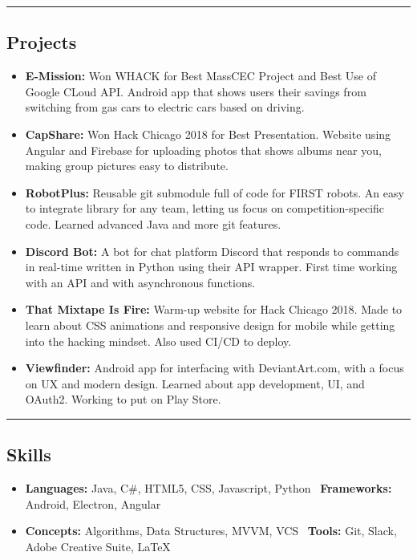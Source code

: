 \documentclass[11pt,letterpaper]{article}
\begin{document}
\hrule
\vspace{-0.4em}
\subsection*{Projects}

\begin{itemize}
	\parskip=0.1em
	
	\item \textbf{E-Mission:}
		Won WHACK for Best MassCEC Project and Best Use of Google CLoud API. Android app that shows users their savings from switching from gas cars to electric cars based on driving. 
	
	\item \textbf{CapShare:}
		Won Hack Chicago 2018 for Best Presentation. Website using Angular and Firebase for uploading photos that shows albums near you, making group pictures easy to distribute. 
		
	\item \textbf{RobotPlus:}
		Reusable git submodule full of code for FIRST robots. An easy to integrate library for any team, letting us focus on competition-specific code. Learned advanced Java and more git features. 
		
	\item \textbf{Discord Bot:}
		A bot for chat platform Discord that responds to commands in real-time written in Python using their API wrapper. First time working with an API and with asynchronous functions.
		
	\item \textbf{That Mixtape Is Fire:}
		Warm-up website for Hack Chicago 2018. Made to learn about CSS animations and responsive design for mobile while getting into the hacking mindset. Also used CI/CD to deploy. 
	
	\item \textbf{Viewfinder:}
		Android app for interfacing with DeviantArt.com, with a focus on UX and modern design.  Learned about app development, UI, and OAuth2. Working to put on Play Store.

\end{itemize}

\hrule
\vspace{-0.4em}
\subsection*{Skills}

\begin{itemize}
	\parskip=0.1em

	\item \textbf{Languages:} Java, C\#, HTML5, CSS, Javascript, Python \textbullet \ 
		\textbf{Frameworks:} Android, Electron, Angular %
	\item \textbf{Concepts:} Algorithms, Data Structures, MVVM, VCS \textbullet \ 
		\textbf{Tools:} Git, Slack, Adobe Creative Suite, \LaTeX
	
\end{itemize}
\end{document}
